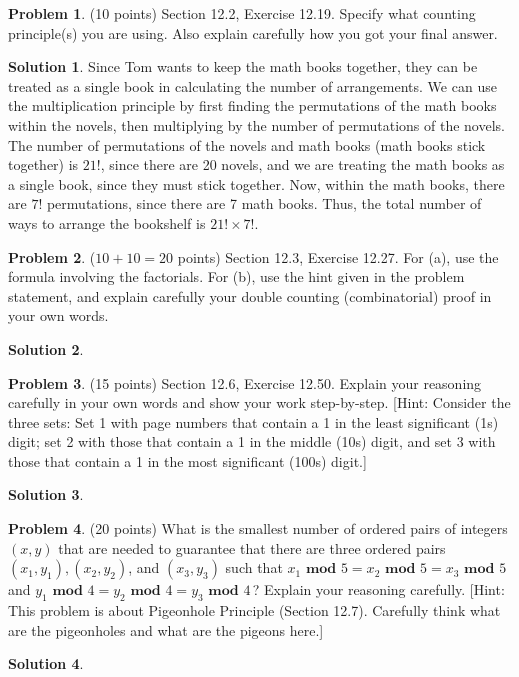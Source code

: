 \documentclass{article}
\theoremstyle{definition}
\newtheorem{problem}{Problem}
\newtheorem*{solution}{Solution}
\begin{document}
\newpage
\begin{problem} (10 points) Section 12.2, Exercise 12.19.  Specify what counting principle(s)
you are using.  Also explain carefully how you got your final answer.
\end{problem}
\begin{solution}
Since Tom wants to keep the math books together, they can be treated as a single book in calculating the number of arrangements.
We can use the multiplication principle by first finding the permutations of the math books within the novels, then multiplying by the number of permutations of the novels.
The number of permutations of the novels and math books (math books stick together) is $21!$,
since there are 20 novels, and we are treating the math books as a single book, since they must stick together.
Now, within the math books, there are $7!$ permutations, since there are 7 math books.
Thus, the total number of ways to arrange the bookshelf is $21! \times 7!$.
\end{solution}

\newpage
\begin{problem} ($10+10=20$ points) Section 12.3, Exercise 12.27.
For (a), use the formula involving the factorials.  For (b), use the hint given in the
problem statement, and explain carefully your double counting (combinatorial) 
proof in your own words.
\end{problem}
\begin{solution} 
\end{solution}

\newpage
\begin{problem} (15 points) Section 12.6, Exercise 12.50.  Explain your reasoning
carefully in your own words and show your work step-by-step.
[Hint: Consider the three sets: Set 1 with page numbers that contain a 1 in the least 
significant (1s) digit; set 2 with those that contain a 1 in the middle (10s) digit, and 
set 3 with those that contain a 1 in the most significant (100s) digit.]
\end{problem}
\begin{solution} 
\end{solution}

\newpage
\begin{problem} (20 points) What is the smallest number of ordered pairs of integers 
$(x, y)$ that are needed to guarantee that there are three ordered pairs 
$(x_1, y_1), (x_2, y_2)$, and $(x_3, y_3)$ such that
$x_1\textbf{ mod } 5 = x_2 \textbf{ mod } 5 = x_3 \textbf{ mod } 5$ and 
$y_1 \textbf{ mod } 4 = y_2 \textbf{ mod } 4 = y_3 \textbf{ mod } 4$\,?
Explain your reasoning carefully.
[Hint: This problem is about Pigeonhole Principle (Section 12.7). 
Carefully think what are the pigeonholes and what are the pigeons here.]
\end{problem}
\begin{solution} 
\end{solution}
\end{document}
